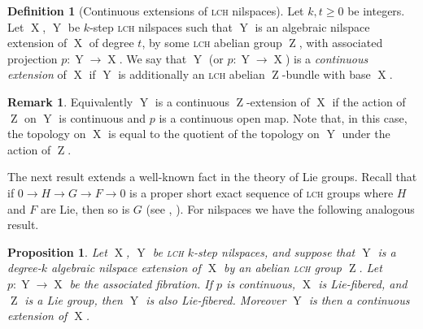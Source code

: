 \documentclass[a4paper,12pt,reqno]{amsart}
\newtheorem{proposition}[theorem]{Proposition}
\theoremstyle{definition}
\newtheorem{defn}[theorem]{Definition}
\newtheorem{remark}[theorem]{Remark}
\def\to{\rightarrow}
\DeclareMathOperator{\ab}{Z}
\DeclareMathOperator{\ns}{X}
\DeclareMathOperator{\nss}{Y}
\begin{document}
\begin{defn}[Continuous extensions of \textsc{lch} nilspaces]\label{def:ext-lch-nil}
Let $k,t\ge 0$ be integers. Let $\ns$, $\nss$ be $k$-step \textsc{lch} nilspaces such that $\nss$ is an algebraic nilspace extension of $\ns$ of degree $t$, by some \textsc{lch} abelian group $\ab$, with associated projection $p:\nss\to\ns$. We say that $\nss$ (or $p:\nss\to \ns$) is a \emph{continuous extension} of $\ns$ if $\nss$ is additionally an \textsc{lch} abelian $\ab$-bundle with base $\ns$.
\end{defn}
\begin{remark}\label{rem:topquot}
Equivalently $\nss$ is a continuous $\ab$-extension of $\ns$ if the action of $\ab$ on $\nss$ is  continuous and $p$ is a continuous open map. Note that, in this case, the topology on $\ns$ is equal to the quotient of the topology on $\nss$ under the action of $\ab$.
\end{remark}
\noindent The next result extends a well-known fact in the theory of Lie groups. Recall that if $0\to H\to G\to F\to 0$ is a proper short exact sequence of \textsc{lch} groups  where $H$ and $F$ are Lie, then so is $G$ (see \cite[Thm.\ 2.6]{Mosk}, \cite[Lem.\ A.3]{HK-non-conv}). For nilspaces we have the following analogous result.

\begin{proposition}\label{prop:ext-lie-is-lie-1}
Let $\ns$, $\nss$ be \textsc{lch} $k$-step nilspaces, and suppose that $\nss$ is a degree-$k$ algebraic nilspace extension of $\ns$ by an abelian \textsc{lch} group $\ab$. Let $p:\nss\to \ns$ be the associated fibration. If $p$ is continuous, $\ns$ is Lie-fibered, and $\ab$ is a Lie group, then $\nss$ is also Lie-fibered. Moreover $\nss$ is then a continuous extension of $\ns$.
\end{proposition}
\end{document}
